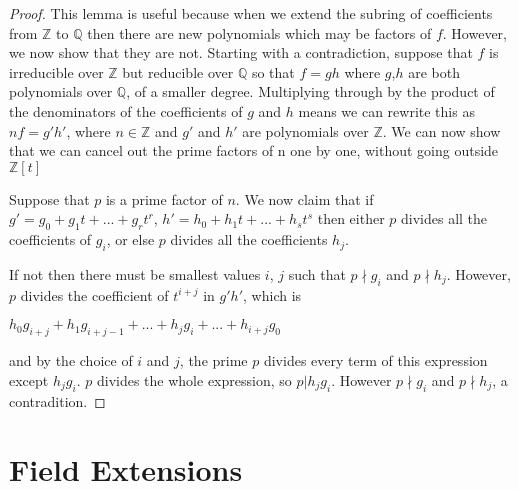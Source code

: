 \documentclass[12pt]{article}
\theoremstyle{definition}
\newcommand{\Z}{\mathbb Z}
\newcommand{\Q}{\mathbb Q}
\begin{document}
\begin{proof}
This lemma is useful because when we extend the subring of coefficients from $\Z$ to $\Q$ then there are new polynomials which may be factors of $f$. However, we now show that they are not. Starting with a contradiction, suppose that $f$ is irreducible over $\Z$ but reducible over $\Q$ so that $f = g h$ where $g$,$h$ are both polynomials over $\Q$, of a smaller degree. Multiplying through by the product of the denominators of the coefficients of $g$ and $h$ means we can rewrite this as $n f = g' h'$, where $n \in \Z$ and $g'$ and $h'$ are polynomials over $\Z$. We can now show that we can cancel out the prime factors of n one by one, without going outside $\Z[t]$

Suppose that $p$ is a prime factor of $n$. We now claim that if $g' = g_0 + g_1 t +...+ g_r t^r$, $h' = h_0 + h_1 t +...+ h_s t^s$ then either $p$ divides all the coefficients of $g_i$, or else $p$ divides all the coefficients $h_j$.

If not then there must be smallest values $i$, $j$ such that $p \nmid g_i$ and $p \nmid h_j$. However, $p$ divides the coefficient of $t^{i+j}$ in $g' h'$, which is 

$h_0 g_{i+j} + h_1 g_{i+j-1} +...+ h_j g_i +...+ h_{i+j} g_0$

and by the choice of $i$ and $j$, the prime $p$ divides every term of this expression except $h_j g_i$. $p$ divides the whole expression, so $p | h_j g_i$. However $p \nmid g_i$ and $p \nmid h_j$, a contradition.
\end{proof}

\section{Field Extensions}
\end{document}
